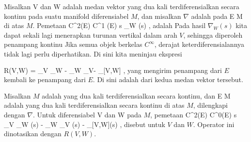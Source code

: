 \setcounter{section}{28}


Misalkan
\mathkor {} {V} {dan} {W} {}
adalah medan vektor yang dua kali terdiferensialkan secara kontinu pada suatu manifold diferensiabel $M$, dan misalkan $\nabla$ adalah
pada
 { E } { M
} {}
di atas $M$. Pemetaan
 {C^2(E) } { C^1 (E)
} { s } { \nabla_W (s)
} {,}
adalah
Pada hasil $\nabla_W (s)$ kita dapat sekali lagi menerapkan turunan vertikal dalam arah $V$, sehingga diperoleh penampang kontinu
 Jika semua objek berkelas $C^\infty$, derajat keterdiferensialannya tidak lagi perlu diperhatikan. Di sini kita meninjau ekspresi

\mavergleichskettedisp
{\vergleichskette
{ R(V,W)
}
{ =} { \nabla_V \nabla_W - \nabla_W \nabla_V- \nabla_{[V,W]}
}
{ } {
}
{ } {
}
{ } {
}
}
{}{}{,}
yang mengirim penampang
 {} {}
dari $E$ kembali ke penampang dari $E$. Di sini
\mathl{[V,W]}{} adalah
dari kedua medan vektor tersebut.

{}
{

Misalkan $M$ adalah
yang dua kali terdiferensialkan secara kontinu, dan
\maabb {} { E } { M
} {}
adalah
yang dua kali terdiferensialkan secara kontinu di atas $M$, dilengkapi dengan
$\nabla$. Untuk
diferensiabel
\mathkor {} {V} {dan} {W} {}
pada $M$, pemetaan
\maabbeledisp {} {C^2(E)} {C^0(E)
} { s } { \nabla_V \nabla_W (s) - \nabla_W \nabla_V (s) - \nabla_{[V,W]}(s)
} {,}
disebut
untuk $V$ dan $W$. Operator ini dinotasikan dengan $R(V,W)$.

}



